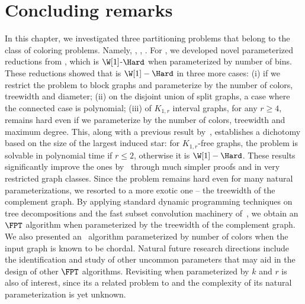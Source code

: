 \section{Concluding remarks}

In this chapter, we investigated three partitioning problems that belong to the class of coloring problems.
Namely, , , .
For , we developed novel parameterized reductions from , which is $\W[1]$-$\Hard$ when parameterized by number of bins.
These reductions showed that  is $\W[1]-\Hard$ in three more cases: (i) if we restrict the problem to block graphs and parameterize by the number of colors, treewidth and diameter; (ii) on the disjoint union of split graphs, a case where the connected case is polynomial; (iii)  of $K_{1,r}$ interval graphs, for any $r \geq 4$, remains hard even if we parameterize by the number of colors, treewidth and maximum degree.
This, along with a previous result by~\cite{claw_free_de_werra}, establishes a dichotomy based on the size of the largest induced star: for $K_{1,r}$-free graphs, the problem is solvable in polynomial time if $r \leq 2$, otherwise it is $\W[1]-\Hard$.
These results significantly improve the ones by~\cite{colorful_treewidth} through much simpler proofs and in very restricted graph classes.
Since the problem remains hard even for many natural parameterizations, we resorted to a more exotic one -- the treewidth of the complement graph.
By applying standard dynamic programming techniques on tree decompositions and the fast subset convolution machinery of~\cite{fourier_mobius}, we obtain an $\FPT$ algorithm when parameterized by the treewidth of the complement graph.
We also presented an \XP\ algorithm parameterized by number of colors when the input graph is known to be chordal.
Natural future research directions include the identification and study of other uncommon parameters that may aid in the design of other $\FPT$ algorithms.
Revisiting  when parameterized by $k$ and $r$ is also of interest, since its a related problem to  and the complexity of its natural parameterization is yet unknown.

